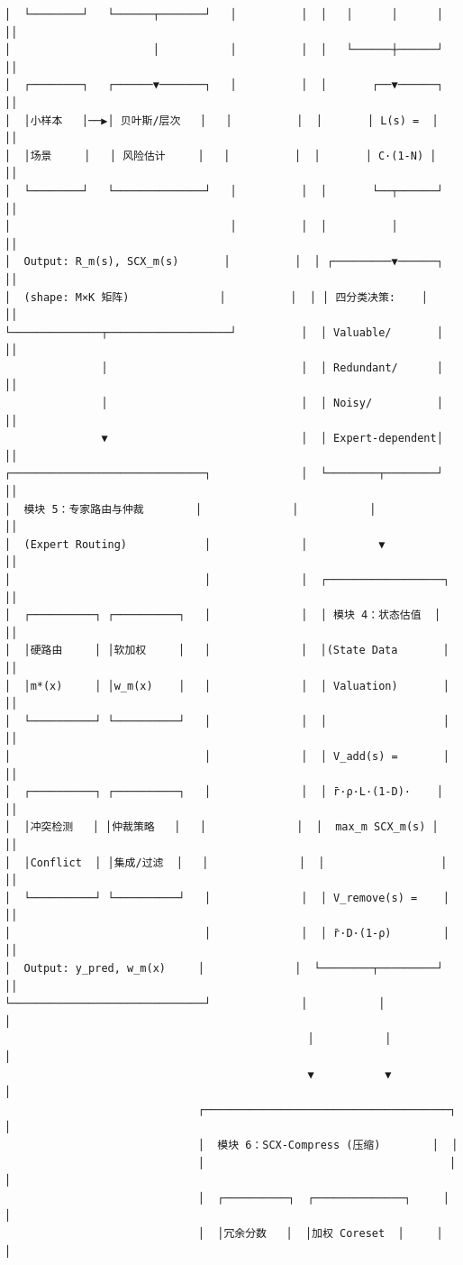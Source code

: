 \documentclass[
  12pt,
]{ctexart}
\begin{document}
\begin{verbatim}
│  └────────┘   └──────┬───────┘   │          │  │   │      │      │    ││
│                      │           │          │  │   └──────┼──────┘    ││
│  ┌────────┐   ┌──────▼───────┐   │          │  │       ┌──▼──────┐   ││
│  │小样本   │──▶│ 贝叶斯/层次   │   │          │  │       │ L(s) =  │   ││
│  │场景     │   │ 风险估计     │   │          │  │       │ C·(1-N) │   ││
│  └────────┘   └──────────────┘   │          │  │       └──┬──────┘   ││
│                                  │          │  │          │          ││
│  Output: R_m(s), SCX_m(s)       │          │  │ ┌─────────▼──────┐   ││
│  (shape: M×K 矩阵)              │          │  │ │ 四分类决策:    │   ││
└──────────────┬───────────────────┘          │  │ Valuable/       │   ││
               │                              │  │ Redundant/      │   ││
               │                              │  │ Noisy/          │   ││
               ▼                              │  │ Expert-dependent│   ││
┌──────────────────────────────┐              │  └────────┬────────┘   ││
│  模块 5：专家路由与仲裁        │              │           │            ││
│  (Expert Routing)            │              │           ▼            ││
│                              │              │  ┌──────────────────┐  ││
│  ┌──────────┐ ┌──────────┐   │              │  │ 模块 4：状态估值  │  ││
│  │硬路由     │ │软加权     │   │              │  │(State Data       │  ││
│  │m*(x)     │ │w_m(x)    │   │              │  │ Valuation)       │  ││
│  └──────────┘ └──────────┘   │              │  │                  │  ││
│                              │              │  │ V_add(s) =       │  ││
│  ┌──────────┐ ┌──────────┐   │              │  │ r̄·ρ·L·(1-D)·    │  ││
│  │冲突检测   │ │仲裁策略   │   │              │  │  max_m SCX_m(s) │  ││
│  │Conflict  │ │集成/过滤  │   │              │  │                  │  ││
│  └──────────┘ └──────────┘   │              │  │ V_remove(s) =    │  ││
│                              │              │  │ r̄·D·(1-ρ)        │  ││
│  Output: y_pred, w_m(x)     │              │  └────────┬─────────┘  ││
└──────────────────────────────┘              │           │            │
                                               │           │            │
                                               ▼           ▼            │
                              ┌──────────────────────────────────────┐  │
                              │  模块 6：SCX-Compress (压缩)        │  │
                              │                                      │  │
                              │  ┌──────────┐  ┌──────────────┐     │  │
                              │  │冗余分数   │  │加权 Coreset  │     │  │

\end{verbatim}
\end{document}
